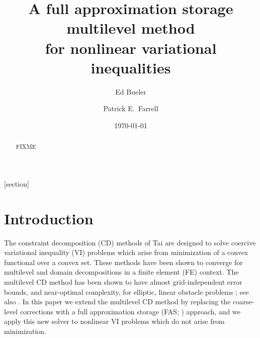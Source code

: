 \documentclass[letterpaper,final,12pt,reqno]{amsart}
\theoremstyle{cstyle}
\theoremstyle{cstyle*}
\theoremstyle{dstyle}
\numberwithin{equation}{section}
\numberwithin{figure}{section}
\numberwithin{table}{section}
\numberwithin{theorem}{section}
\begin{document}
\title[FAS for nonlinear variational inequalities]{A full approximation storage multilevel method \\ for nonlinear variational inequalities}

\author{Ed Bueler}

\author{Patrick E.~Farrell}

\date{\today}

\begin{abstract} FIXME
\end{abstract}

\maketitle


\thispagestyle{empty}

[section]


\section{Introduction} \label{sec:intro}

The constraint decomposition (CD) methods of Tai \cite{Tai2003} are designed to solve coercive variational inequality (VI) problems which arise from minimization of a convex functional over a convex set.  These methods have been shown to converge for multilevel and domain decompositions in a finite element (FE) context.  The multilevel CD method has been shown to have almost grid-independent error bounds, and near-optimal complexity, for elliptic, linear obstacle problems \cite[Subsection 5.4]{Tai2003}; see also \cite[Theorem 4.6 and Algorithm 4.7]{GraeserKornhuber2009}.  In this paper we extend the multilevel CD method by replacing the coarse-level corrections with a full approximation storage (FAS; \cite{Brandt1977,Bruneetal2015}) approach, and we apply this new solver to nonlinear VI problems which do not arise from minimization.
\end{document}
